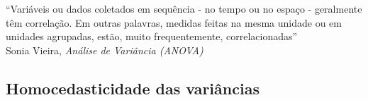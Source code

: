 \documentclass{bredelebeamer}
\begin{document}
\begin{frame}
\vspace{.2cm}

\begin{flushright}
\footnotesize{
\textcolor{blue!75}{``Variáveis ou dados coletados em sequência - no
  tempo ou no espaço - geralmente têm correlação. Em outras palavras,
  medidas feitas na mesma unidade ou em unidades agrupadas, estão, muito
  frequentemente, correlacionadas''}} \\
\tiny{Sonia Vieira, \textit{Análise de Variância (ANOVA)}}
\end{flushright}
\end{frame}

\subsection{Homocedasticidade das variâncias}
\end{document}
